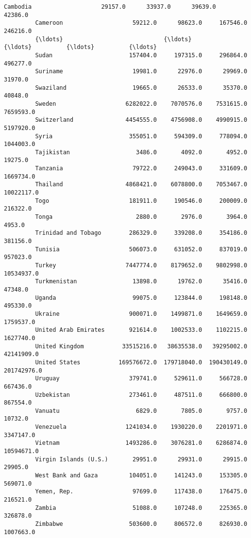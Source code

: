 \documentclass[11pt]{article}
\begin{document}
\begin{Verbatim}[commandchars=\\\{\}]
         Cambodia                    29157.0      33937.0      39639.0      42386.0   
         Cameroon                    59212.0      98623.0     167546.0     246216.0   
         {\ldots}                             {\ldots}          {\ldots}          {\ldots}          {\ldots}   
         Sudan                      157404.0     197315.0     296864.0     496277.0   
         Suriname                    19981.0      22976.0      29969.0      31970.0   
         Swaziland                   19665.0      26533.0      35370.0      40848.0   
         Sweden                    6282022.0    7070576.0    7531615.0    7659593.0   
         Switzerland               4454555.0    4756908.0    4990915.0    5197920.0   
         Syria                      355051.0     594309.0     778094.0    1044003.0   
         Tajikistan                   3486.0       4092.0       4952.0      19275.0   
         Tanzania                    79722.0     249043.0     331609.0    1669734.0   
         Thailand                  4868421.0    6078800.0    7053467.0   10022117.0   
         Togo                       181911.0     190546.0     200009.0     216322.0   
         Tonga                        2880.0       2976.0       3964.0       4953.0   
         Trinidad and Tobago        286329.0     339208.0     354186.0     381156.0   
         Tunisia                    506073.0     631052.0     837019.0     957023.0   
         Turkey                    7447774.0    8179652.0    9802998.0   10534937.0   
         Turkmenistan                13898.0      19762.0      35416.0      47348.0   
         Uganda                      99075.0     123844.0     198148.0     495330.0   
         Ukraine                    900071.0    1499871.0    1649659.0    1759537.0   
         United Arab Emirates       921614.0    1002533.0    1102215.0    1627740.0   
         United Kingdom           33515216.0   38635538.0   39295002.0   42141909.0   
         United States           169576672.0  179718040.0  190430149.0  201742976.0   
         Uruguay                    379741.0     529611.0     566728.0     667436.0   
         Uzbekistan                 273461.0     487511.0     666800.0     867554.0   
         Vanuatu                      6829.0       7805.0       9757.0      10732.0   
         Venezuela                 1241034.0    1930220.0    2201971.0    3347147.0   
         Vietnam                   1493286.0    3076281.0    6286874.0   10594671.0   
         Virgin Islands (U.S.)       29951.0      29931.0      29915.0      29905.0   
         West Bank and Gaza         104051.0     141243.0     153305.0     569071.0   
         Yemen, Rep.                 97699.0     117438.0     176475.0     216521.0   
         Zambia                      51088.0     107248.0     225365.0     326878.0   
         Zimbabwe                   503600.0     806572.0     826930.0    1007663.0   
         

\end{Verbatim}
\end{document}
